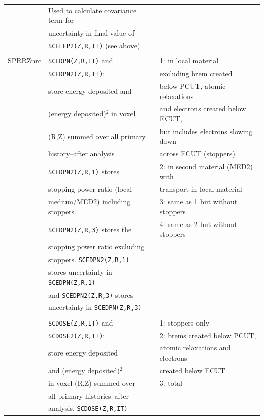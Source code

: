 \documentclass[12pt,twoside]{article}  %
\begin{document}
\begin{longtable}{lll}
         & Used to calculate covariance term for&\\
         & uncertainty in final value of &\\
         & {\tt SCELEP2(Z,R,IT)} (see above)&\\
         &&\\  
SPRRZnrc & {\tt SCEDPN(Z,R,IT)} and & 1: in local material \\
         & {\tt SCEDPN2(Z,R,IT)}: &  excluding brem created \\
         & store energy deposited and &  below PCUT, atomic relaxations \\
         & (energy deposited)$^2$ in voxel&  and electrons created below ECUT,\\
         & (R,Z) summed over all primary & but includes electrons slowing down\\
         & history--after analysis  &  across ECUT (stoppers)\\
         & {\tt SCEDPN2(Z,R,1)} stores & 2: in second material (MED2) with\\
         & stopping power ratio (local &  transport in local material  \\
         & medium/MED2) including stoppers.& 3: same as 1 but without stoppers\\
        & {\tt SCEDPN2(Z,R,3)} stores the & 4: same as 2 but without stoppers\\ 
         & stopping power ratio excluding &\\
         & stoppers.  {\tt SCEDPN2(Z,R,1)} &\\
         & stores uncertainty in {\tt SCEDPN(Z,R,1)}&\\
         & and {\tt SCEDPN2(Z,R,3)} stores &\\
         & uncertainty in {\tt SCEDPN(Z,R,3)}&\\
         &&\\
         & {\tt SCDOSE(Z,R,IT)} and & 1: stoppers only\\
         & {\tt SCDOSE2(Z,R,IT)}: & 2: brems created below PCUT,\\
         & store energy deposited &  atomic relaxations and electrons\\
         & and (energy deposited)$^2$ & created below ECUT\\
         & in voxel (R,Z) summed over & 3: total\\
         & all primary histories--after &\\
         & analysis, {\tt SCDOSE(Z,R,IT)} &\\

\end{longtable}
\end{document}
